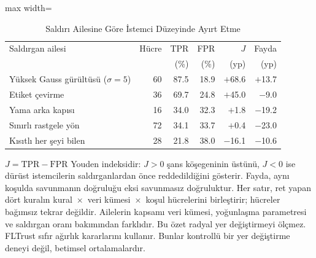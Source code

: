 \begin{table}[!t]
\centering\footnotesize
\setlength{\tabcolsep}{4pt}
\caption{Saldırı Ailesine Göre İstemci Düzeyinde Ayırt Etme}\label{tab:discrimination}
\begin{adjustbox}{max width=\columnwidth}
\begin{tabular}{lrrrrr}
\toprule
Saldırgan ailesi & Hücre & TPR & FPR & $J$ & Fayda \\
 &  & (\%) & (\%) & (yp) & (yp) \\
\midrule
Yüksek Gauss gürültüsü ($\sigma=5$) & 60 & 87.5 & 18.9 & $+$68.6 & $+$13.7 \\
Etiket çevirme & 36 & 69.7 & 24.8 & $+$45.0 & $-$9.0 \\
Yama arka kapısı & 16 & 34.0 & 32.3 & $+$1.8 & $-$19.2 \\
Sınırlı rastgele yön & 72 & 34.1 & 33.7 & $+$0.4 & $-$23.0 \\
Kısıtlı her şeyi bilen & 28 & 21.8 & 38.0 & $-$16.1 & $-$10.6 \\
\bottomrule
\end{tabular}
\end{adjustbox}

\par\vspace{3pt}\parbox{\linewidth}{\footnotesize $J=\mathrm{TPR}-\mathrm{FPR}$ Youden indeksidir: $J>0$ şans köşegeninin üstünü, $J<0$ ise dürüst istemcilerin saldırganlardan önce reddedildiğini gösterir. Fayda, aynı koşulda savunmanın doğruluğu eksi savunmasız doğruluktur. Her satır, ret yapan dört kuralın kural~$\times$~veri kümesi~$\times$~koşul hücrelerini birleştirir; hücreler bağımsız tekrar değildir. Ailelerin kapsamı veri kümesi, yoğunlaşma parametresi ve saldırgan oranı bakımından farklıdır. Bu özet radyal yer değiştirmeyi ölçmez. FLTrust sıfır ağırlık kararlarını kullanır. Bunlar kontrollü bir yer değiştirme deneyi değil, betimsel ortalamalardır.}
\end{table}
